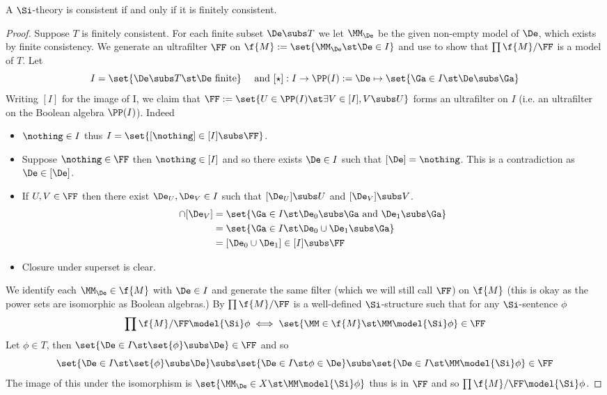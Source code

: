 \begin{cor}
    A $\Si$-theory is consistent if and only if it is finitely consistent.
\end{cor}
\begin{proof}
    Suppose $T$ is finitely consistent.
    For each finite subset $\De \subs T$ we let $\MM_\De$ be the given 
    non-empty model of $\De$,
    which exists by finite consistency.
    We generate an ultrafilter $\FF$ on 
    $\f{M} := \set{\MM_\De \st \De \in I}$ and use 
     to show that
    $\prod \f{M} / \FF$ is a model of $T$.
    Let
    \[I = \set{\De \subs T \st \De \text{ finite}}
    \quad \text{ and } [\star] : I \to \PP(I) := 
    \De \mapsto \set{\Ga \in I \st \De \subs \Ga}\]
    Writing $[I]$ for the image of I,
    we claim that $\FF := \set{U \in \PP(I) \st \exists V \in [I], V \subs U}$
    forms an ultrafilter on $I$ 
    (i.e. an ultrafilter on the Boolean algebra $\PP(I)$).
    Indeed 
    \begin{itemize}
        \item $\nothing \in I$ thus $I = \set{[\nothing]  \in [I] \subs \FF}$.
        \item Suppose $\nothing \in \FF$ then $\nothing \in [I]$ and so there 
            exists $\De \in I$ such that $[\De] = \nothing$.
            This is a contradiction as $\De \in [\De]$.
        \item If $U, V \in \FF$ then there exist $\De_U, \De_V \in I$ 
            such that $[\De_U] \subs U$ and $[\De_V] \subs V$. 
            \begin{align*}
                [\De_U] \cap [\De_V] &
                = \set{\Ga \in I \st \De_0 \subs \Ga 
                \text{ and } \De_1 \subs \Ga}\\
                &= \set{\Ga \in I \st \De_0 \cup \De_1 \subs \Ga}\\
                &= [\De_0 \cup \De_1] \in [I] \subs \FF
            \end{align*}
        \item Closure under superset is clear.
    \end{itemize}
    We identify each $\MM_\De \in \f{M}$ with $\De \in I$ and generate
    the same filter (which we will still call $\FF$) on $\f{M}$ 
    (this is okay as the power sets are isomorphic as Boolean algebras.)
    By  $\prod \f{M} / \FF$ is 
    a well-defined $\Si$-structure such that for any $\Si$-sentence $\phi$
    \[\prod \f{M} / \FF \model{\Si} \phi \iff 
    \set{\MM \in \f{M} \st \MM \model{\Si} \phi} \in \FF\]
    Let $\phi \in T$, 
    then $\set{\De \in I \st \set{\phi} \subs \De} \in \FF$ and so
    \[
        \set{\De \in I \st \set{\phi} \subs \De} \subs 
        \set{\De \in I \st \phi \in \De} \subs
        \set{\De \in I \st \MM \model{\Si} \phi} \in \FF
    \]
    The image of this under the isomorphism is 
    $\set{\MM_\De \in X \st \MM \model{\Si} \phi}$ thus is in $\FF$ and so 
    $\prod \f{M} / \FF \model{\Si} \phi$.
\end{proof}

